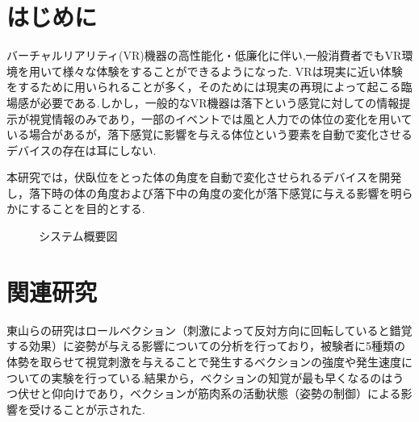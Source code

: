 \documentclass[uplatex]{jsarticle}
\begin{document}
\vspace{3mm}

\setcounter{page}{9}

\section{はじめに}

 
バーチャルリアリティ(VR)機器の高性能化・低廉化に伴い,一般消費者でもVR環境を用いて様々な体験をすることができるようになった.
VRは現実に近い体験をするために用いられることが多く，そのためには現実の再現によって起こる臨場感が必要である.しかし，一般的なVR機器は落下という感覚に対しての情報提示が視覚情報のみであり，一部のイベントでは風と人力での体位の変化を用いている場合があるが，落下感覚に影響を与える体位という要素を自動で変化させるデバイスの存在は耳にしない.

本研究では，伏臥位をとった体の角度を自動で変化させられるデバイスを開発し，落下時の体の角度および落下中の角度の変化が落下感覚に与える影響を明らかにすることを目的とする.

\begin{figure}[tb]
  \centering
  \caption{システム概要図}
  \label{fig:about_system}

\end{figure}

\section{関連研究}
東山らの研究\cite{vection}はロールベクション（刺激によって反対方向に回転していると錯覚する効果）に姿勢が与える影響についての分析を行っており，被験者に5種類の体勢を取らせて視覚刺激を与えることで発生するベクションの強度や発生速度についての実験を行っている.結果から，ベクションの知覚が最も早くなるのはうつ伏せと仰向けであり，ベクションが筋肉系の活動状態（姿勢の制御）による影響を受けることが示された.
\end{document}
